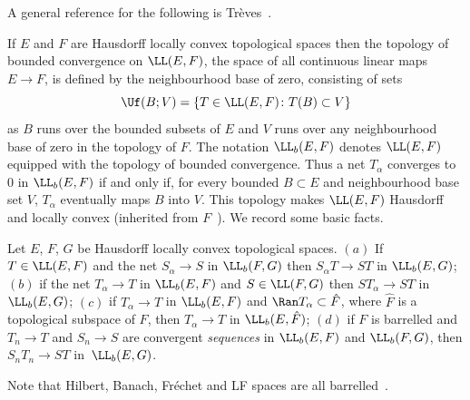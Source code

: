  A general reference for the following is Tr\`eves~\cite[Chapter~32]{Treves:TVS}.

 If $E$ and $F$ are Hausdorff locally convex topological spaces then the topology of bounded convergence on $\LL(E,F)$, the space of all continuous linear maps $E\to F$, is defined by the neighbourhood base of zero, consisting of sets
 \begin{equation*}
 	\Uf(B;V) = \{T\in \LL(E,F)\colon T(B)\subset V\}
 \end{equation*}
 as $B$ runs over the bounded subsets of $E$ and $V$ runs over any neighbourhood base of zero in the topology of $F$. The notation $\LL_b(E,F)$ denotes $\LL(E,F)$ equipped with the topology of bounded convergence.
 Thus a net $T_\alpha$ converges to $0$ in $\LL_b(E,F)$
 if and only if, for every bounded $B\subset E$ and neighbourhood base set $V$,
 $T_\alpha$ eventually maps $B$ into $V$. This topology makes $\LL(E,F)$ Hausdorff and locally convex (inherited from $F$~\cite[p.~336]{Treves:TVS}). We record some basic facts.
 \begin{Lemma}\label{lem:Lb_basic}
 	Let $E$, $F$, $G$ be Hausdorff locally convex topological spaces. $(a)$ If $T\in \LL(E,F)$ and the net $S_\alpha\to S$ in $\LL_b(F,G)$ then $S_\alpha T\to ST$ in $\LL_b(E,G)$; $(b)$ if the net $T_\alpha\to T$ in $\LL_b(E,F)$ and $S\in \LL(F,G)$ then
 	$ST_\alpha\to ST$ in $\LL_b(E,G)$; $(c)$ if $T_\alpha\to T$ in $\LL_b(E,F)$ and $\Ran T_\alpha\subset \hat{F}$, where $\hat{F}$ is a topological subspace of $F$, then $T_\alpha\to T$ in $\LL_b(E,\hat{F})$; $(d)$ if $F$ is barrelled and $T_n\to T$ and $S_n\to S$ are convergent \emph{sequences} in $\LL_b(E,F)$ and $\LL_b(F,G)$, then $S_n T_n\to ST$ in~$\LL_b(E,G)$.
 \end{Lemma}
 Note that Hilbert, Banach, Fr\'echet and LF spaces are all barrelled~\cite[Chapter~33]{Treves:TVS}.
